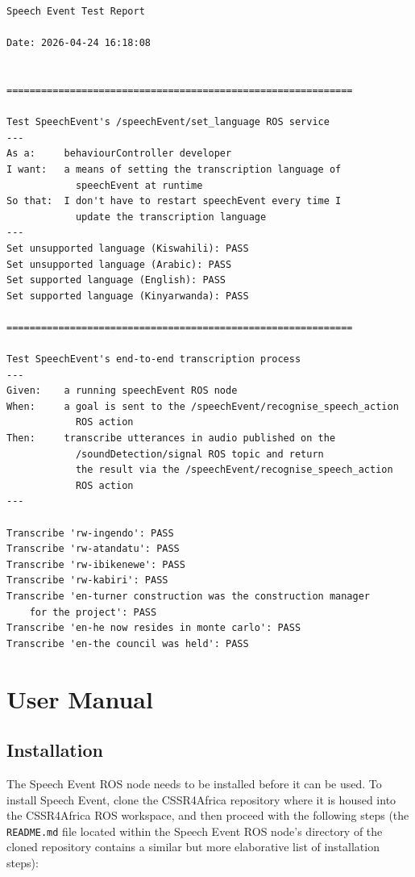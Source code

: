 \documentclass{CSSRforAfrica}
\begin{document}
\begin{verbatim}
Speech Event Test Report
    
Date: 2026-04-24 16:18:08
    
    
============================================================
    
Test SpeechEvent's /speechEvent/set_language ROS service
---
As a:     behaviourController developer
I want:   a means of setting the transcription language of
            speechEvent at runtime
So that:  I don't have to restart speechEvent every time I
            update the transcription language
---
Set unsupported language (Kiswahili): PASS
Set unsupported language (Arabic): PASS
Set supported language (English): PASS
Set supported language (Kinyarwanda): PASS

============================================================

Test SpeechEvent's end-to-end transcription process
---
Given:    a running speechEvent ROS node
When:     a goal is sent to the /speechEvent/recognise_speech_action
            ROS action
Then:     transcribe utterances in audio published on the
            /soundDetection/signal ROS topic and return
            the result via the /speechEvent/recognise_speech_action
            ROS action
---

Transcribe 'rw-ingendo': PASS
Transcribe 'rw-atandatu': PASS
Transcribe 'rw-ibikenewe': PASS
Transcribe 'rw-kabiri': PASS
Transcribe 'en-turner construction was the construction manager
    for the project': PASS
Transcribe 'en-he now resides in monte carlo': PASS
Transcribe 'en-the council was held': PASS
\end{verbatim}


\newpage
\section{User Manual}
\subsection{Installation}
The Speech Event ROS node needs to be installed before it can be used. To install Speech Event, clone the CSSR4Africa repository where it is housed into the CSSR4Africa ROS workspace, and then proceed with the following steps (the \texttt{README.md} file located within the Speech Event ROS node's directory of the cloned repository contains a similar but more elaborative list of installation steps):
\end{document}
